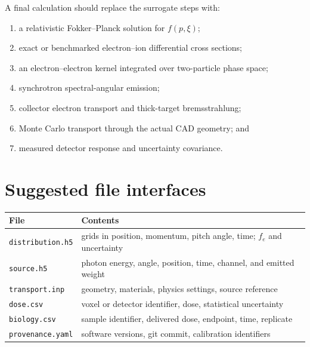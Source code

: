 A final calculation should replace the surrogate steps with:
\begin{enumerate}
\item a relativistic Fokker--Planck solution for $f(p,\xi)$;
\item exact or benchmarked electron--ion differential cross sections;
\item an electron--electron kernel integrated over two-particle phase space;
\item synchrotron spectral-angular emission;
\item collector electron transport and thick-target bremsstrahlung;
\item Monte Carlo transport through the actual CAD geometry; and
\item measured detector response and uncertainty covariance.
\end{enumerate}

\section{Suggested file interfaces}

\begin{longtable}{p{}p{}}
\toprule
File & Contents \\
\midrule
\texttt{distribution.h5} & grids in position, momentum, pitch angle, time; $f_e$ and uncertainty \\
\texttt{source.h5} & photon energy, angle, position, time, channel, and emitted weight \\
\texttt{transport.inp} & geometry, materials, physics settings, source reference \\
\texttt{dose.csv} & voxel or detector identifier, dose, statistical uncertainty \\
\texttt{biology.csv} & sample identifier, delivered dose, endpoint, time, replicate \\
\texttt{provenance.yaml} & software versions, git commit, calibration identifiers \\
\bottomrule
\end{longtable}
